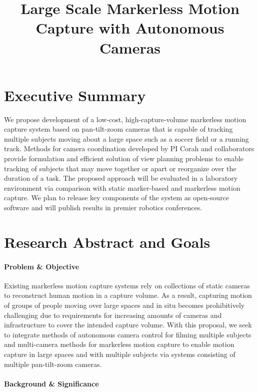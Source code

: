 \documentclass[12pt]{article}
\title{Large Scale Markerless Motion Capture with Autonomous Cameras}
\author{}
\date{}
\begin{document}
\maketitle

\section{Executive Summary}


We propose development of a low-cost, high-capture-volume markerless motion
capture system based on pan-tilt-zoom cameras that is capable of tracking
multiple subjects moving about a large space such as a soccer field or a running
track.
Methods for camera coordination developed by PI Corah and collaborators provide
formulation and efficient solution of view planning problems to enable tracking
of subjects that may move together or apart or reorganize over the duration of a
task.
The proposed approach will be evaluated in a laboratory environment via
comparison with static marker-based and markerless motion capture.
We plan to release key components of the system as open-source software and will
publish results in premier robotics conferences.

\section{Research Abstract and Goals}

\paragraph{Problem \& Objective}

Existing markerless motion capture systems rely on collections of static cameras
to reconstruct human motion in a capture volume.
As a result, capturing motion of groups of people moving over large spaces and
in situ becomes prohibitively challenging due to requirements for increasing
amounts of cameras and infrastructure to cover the intended capture volume.
With this proposal, we seek to integrate methods of autonomous camera control
for filming multiple subjects and multi-camera methods for markerless motion
capture to enable motion capture in large spaces and with multiple subjects via
systems consisting of multiple pan-tilt-zoom cameras.

\paragraph{Background \& Significance}
\end{document}
